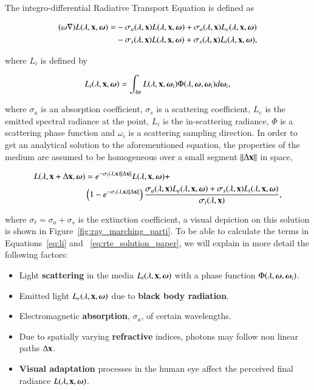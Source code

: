 The integro-differential Radiative Transport Equation is defined as

\begin{equation}
\begin{split}
(\omega \nabla) L(\lambda, \mathbf{x}, \boldsymbol{\omega}) = &- \sigma_a(\lambda, \mathbf{x}) L(\lambda, \mathbf{x}, \boldsymbol{\omega}) + \sigma_a(\lambda, \mathbf{x}) L_e(\lambda, \mathbf{x}, \boldsymbol{\omega}) \\
&- \sigma_s(\lambda, \mathbf{x}) L(\lambda, \mathbf{x}, \boldsymbol{\omega}) + \sigma_s(\lambda, \mathbf{x}) L_i(\lambda, \mathbf{x}, \boldsymbol{\omega}),
\end{split}
\end{equation}

where $L_i$ is defined by

\begin{equation}
\label{eq:li}
L_i(\lambda, \mathbf{x}, \boldsymbol{\omega}) = \int_{4 \pi} L(\lambda, \mathbf{x}, \boldsymbol{\omega}_i) \Phi (\lambda, \boldsymbol{\omega}, \boldsymbol{\omega}_i) d \boldsymbol{\omega}_i,
\end{equation}

where $\sigma_a$ is an absorption coefficient, $\sigma_s$ is a scattering coefficient, $L_e$ is the emitted spectral radiance at the point, $L_i$ is the in-scattering radiance, $\Phi$ is a scattering phase function and $\omega_i$ is a scattering sampling direction.
In order to get an analytical solution to the aforementioned equation, the properties of the medium are assumed to be homogeneous over a small segment $\left \| \Delta \mathbf{x} \right \|$ in space,

\begin{equation}
\label{eq:rte_solution_paper}
\begin{split}
L(\lambda, \mathbf{x} + \Delta\mathbf{x}, \boldsymbol{\omega}) &= e^{-\sigma_t(\lambda, \mathbf{x}) \left \| \Delta \mathbf{x} \right \|} L(\lambda, \mathbf{x}, \boldsymbol{\omega}) +  \\
& \left(1 - e^{-\sigma_t(\lambda, \mathbf{x}) \left \| \Delta \mathbf{x} \right \|} \right) \frac{\sigma_a(\lambda, \mathbf{x}) L_e(\lambda, \mathbf{x}, \boldsymbol{\omega}) + \sigma_s(\lambda, \mathbf{x}) L_i(\lambda, \mathbf{x}, \boldsymbol{\omega})}{\sigma_t(\lambda, \mathbf{x})},
\end{split}
\end{equation}

where $\sigma_t = \sigma_a + \sigma_s$ is the extinction coefficient, a visual depiction on this solution is shown in Figure~\ref{fig:ray_marching_parti}.
To be able to calculate the terms in Equations~\ref{eq:li} and ~\ref{eq:rte_solution_paper}, we will explain in more detail the following factors:

\begin{itemize}
\item Light \textbf{scattering} in the media $L_i(\lambda, \mathbf{x}, \boldsymbol{\omega})$ with a phase function $\Phi(\lambda, \boldsymbol{\omega}, \boldsymbol{\omega}_i)$.
\item Emitted light $L_e(\lambda, \mathbf{x}, \boldsymbol{\omega})$ due to \textbf{black body radiation}.
\item Electromagnetic \textbf{absorption}, $\sigma_a$, of certain wavelengths.
\item Due to spatially varying \textbf{refractive} indices, photons may follow non linear paths $\Delta\mathbf{x}$.
\item \textbf{Visual adaptation} processes in the human eye affect the perceived final radiance $L(\lambda, \mathbf{x}, \boldsymbol{\omega})$.
\end{itemize}

